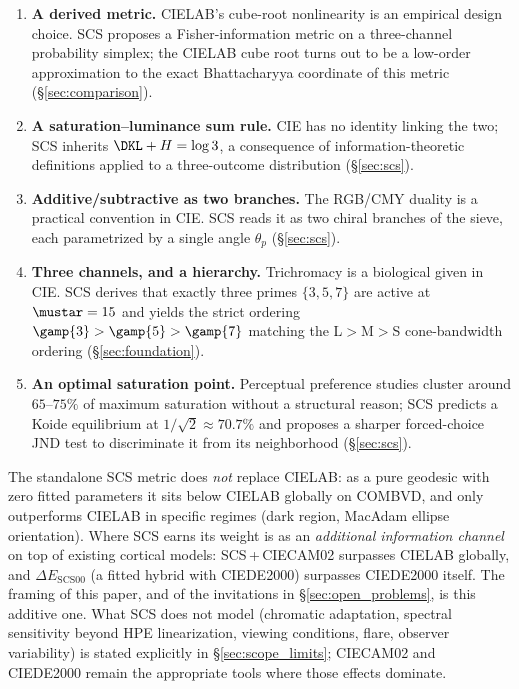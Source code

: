 \documentclass[12pt,a4paper]{article}
\begin{document}
\begin{enumerate}[nosep]
\item \textbf{A derived metric.} CIELAB's cube-root nonlinearity is an
  empirical design choice. SCS proposes a Fisher-information metric on
  a three-channel probability simplex; the CIELAB cube root turns out
  to be a low-order approximation to the exact Bhattacharyya coordinate
  of this metric (\S\ref{sec:comparison}).
\item \textbf{A saturation--luminance sum rule.} CIE has no identity
  linking the two; SCS inherits $\DKL + H = \log 3$, a consequence of
  information-theoretic definitions applied to a three-outcome
  distribution (\S\ref{sec:scs}).
\item \textbf{Additive/subtractive as two branches.} The RGB/CMY duality
  is a practical convention in CIE. SCS reads it as two chiral branches
  of the sieve, each parametrized by a single angle $\theta_p$
  (\S\ref{sec:scs}).
\item \textbf{Three channels, and a hierarchy.} Trichromacy is a
  biological given in CIE. SCS derives that exactly three primes
  $\{3, 5, 7\}$ are active at $\mustar = 15$ and yields the strict
  ordering $\gamp{3} > \gamp{5} > \gamp{7}$ matching the L$>$M$>$S
  cone-bandwidth ordering (\S\ref{sec:foundation}).
\item \textbf{An optimal saturation point.} Perceptual preference
  studies cluster around $65$--$75\%$ of maximum saturation without a
  structural reason; SCS predicts a Koide equilibrium at
  $1/\sqrt{2} \approx 70.7\%$ and proposes a sharper forced-choice JND
  test to discriminate it from its neighborhood (\S\ref{sec:scs}).
\end{enumerate}

The standalone SCS metric does \emph{not} replace CIELAB: as a pure
geodesic with zero fitted parameters it sits below CIELAB globally on
COMBVD, and only outperforms CIELAB in specific regimes (dark region,
MacAdam ellipse orientation). Where SCS earns its weight is as an
\emph{additional information channel} on top of existing cortical
models: SCS\,+\,CIECAM02 surpasses CIELAB globally, and
$\Delta E_{\mathrm{SCS00}}$ (a fitted hybrid with CIEDE2000) surpasses
CIEDE2000 itself. The framing of this paper, and of the invitations in
\S\ref{sec:open_problems}, is this additive one. What SCS does not
model (chromatic adaptation, spectral sensitivity beyond HPE
linearization, viewing conditions, flare, observer variability) is
stated explicitly in \S\ref{sec:scope_limits}; CIECAM02 and CIEDE2000
remain the appropriate tools where those effects dominate.
\end{document}
